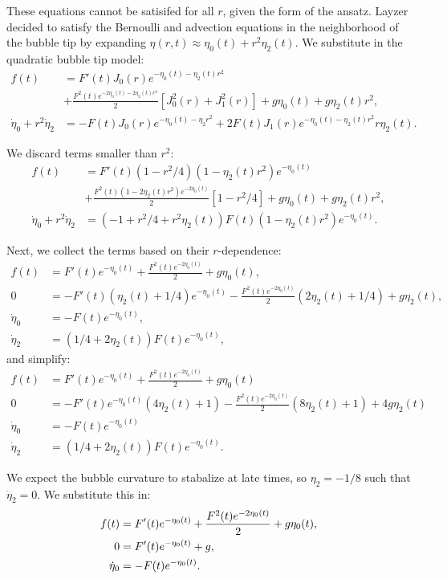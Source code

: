 These equations cannot be satisifed for all $r$, given the form of the ansatz.
Layzer decided to satisfy the Bernoulli and advection equations in the neighborhood of the bubble tip by expanding $\eta(r,t) \approx \eta_0(t) + r^2 \eta_2(t)$.
We substitute in the quadratic bubble tip model:
\begin{align}
f(t) &= F'(t) J_0(r) e^{-\eta_0(t)-\eta_2(t)r^2} \\ \nonumber
	&+ \frac{F^2(t) e^{-2\eta_0(t)-2\eta_2(t)r^2}}{2} \left[ J_0^2(r)  + J_1^2(r) \right] + g \eta_0(t) + g \eta_2(t)r^2 ,\\
\dot\eta_0 + r^2 \dot\eta_2 &=  -F(t) J_0(r)e^{-\eta_0(t) - \eta_2 r^2}  + 2 F(t) J_1(r) e^{-\eta_0(t) - \eta_2(t)r^2} r \eta_2(t) .
\end{align}

We discard terms smaller than $r^2$:
\begin{align}
f(t) &= F'(t) \left(1-r^2/4\right) (1-\eta_2(t)r^2) e^{-\eta_0(t)} \\ \nonumber
	&+ \frac{F^2(t) (1-2\eta_2(t)r^2) e^{-2\eta_0(t)}}{2} \left[1-r^2/4\right] + g \eta_0(t) + g \eta_2(t)r^2 ,\\
\dot\eta_0 + r^2 \dot\eta_2 &= (-1+r^2/4 + r^2 \eta_2(t)) F(t) (1-\eta_2(t)r^2) e^{-\eta_0(t)} .
\end{align}

Next, we collect the terms based on their $r$-dependence:
\begin{align}
f(t) &= F'(t) e^{-\eta_0(t)} + \frac{F^2(t) e^{-2\eta_0(t)}}{2} + g \eta_0(t) , \\
0 &= - F'(t)(\eta_2(t)+ 1/4) e^{-\eta_0(t)} - \frac{F^2(t) e^{-2\eta_0(t)}}{2}(2\eta_2(t)+1/4) + g \eta_2(t) ,\\
\dot\eta_0  &= - F(t)  e^{-\eta_0(t)} , \\
\dot\eta_2 &= (1/4 + 2\eta_2(t)) F(t)  e^{-\eta_0(t)} ,
\end{align}
and simplify:
\begin{align}
f(t) &= F'(t) e^{-\eta_0(t)} + \frac{F^2(t) e^{-2\eta_0(t)}}{2} + g \eta_0(t)  \\
0 &= - F'(t) e^{-\eta_0(t)} (4\eta_2(t)+ 1)- \frac{F^2(t) e^{-2\eta_0(t)}}{2}(8\eta_2(t)+1) + 4g \eta_2(t) \\
\dot\eta_0  &= - F(t)  e^{-\eta_0(t)}  \\
\dot\eta_2 &= (1/4 + 2\eta_2(t)) F(t)  e^{-\eta_0(t)} .
\end{align}

We expect the bubble curvature to stabalize at late times, so $\eta_2 = -1/8$ such that $\dot\eta_2 = 0$.
We substitute this in:
\begin{align}
f(t) &= F'(t) e^{-\eta_0(t)} + \frac{F^2(t) e^{-2\eta_0(t)}}{2} + g \eta_0(t) , \\
0 &=  F'(t) e^{-\eta_0(t)}  + g , \\
	\dot\eta_0  &= - F(t)  e^{-\eta_0(t)} . \elabel{etaev}
\end{align}

